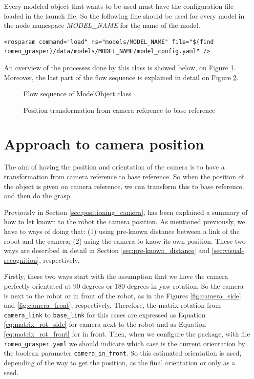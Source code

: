 \documentclass[12pt,a4paper,final,twoside,openright]{report}
\begin{document}
\newpage
Every modeled object that wants to be used must have the configuration file loaded in the launch file. So the following line should be used for every model in the node namespace \textit{MODEL\_NAME} for the name of the model.
\begin{lstlisting}[language=ROS]
<rosparam command="load" ns="models/MODEL_NAME" file="$(find romeo_grasper)/data/models/MODEL_NAME/model_config.yaml" />
\end{lstlisting}

An overview of the processes done by this class is showed below, on Figure \ref{fig:flow_model_object}. Moreover, the last part of the flow sequence is explained in detail on Figure \ref{fig:model_object_transform}.

\begin{figure}[h]
\centering

\caption{Flow sequence of ModelObject class\label{fig:flow_model_object}}
\end{figure}

\begin{figure}[h]
\centering

\caption{Position transformation from camera reference to base reference\label{fig:model_object_transform}}
\end{figure}


\section{Approach to camera position} 
\label{sec:impl_camera_approach}

The aim of having the position and orientation of the camera is to have a transformation from camera reference to base reference. So when the position of the object is given on camera reference, we can transform this to base reference, and then do the grasp.

Previously in Section \ref{sec:positioning_camera}, has been explained a summary of how to let known to the robot the camera position. As mentioned previously, we have to ways of doing that: (1) using pre-known distance between a link of the robot and the camera; (2) using the camera to know its own position. These two ways are described in detail in Section \ref{sec:pre-known_distance} and \ref{sec:visual-recognition}, respectively.

Firstly, these two ways start with the assumption that we have the camera perfectly orientated at 90 degrees or 180 degrees in yaw rotation. So the camera is next to the robot or in front of the robot, as in the Figures \ref{fig:camera_side} and \ref{fig:camera_front}, respectively. Therefore, the matrix rotation from \texttt{camera\_link} to \texttt{base\_link} for this cases are expressed as Equation \eqref{eq:matrix_rot_side} for camera next to the robot and as Equation \eqref{eq:matrix_rot_front} for in front. Then, when we configure the package, with file \texttt{romeo\_grasper.yaml} we should indicate which case is the current orientation by the boolean parameter \texttt{camera\_in\_front}. So this estimated orientation is used, depending of the way to get the position, as the final orientation or only as a seed.
\end{document}
